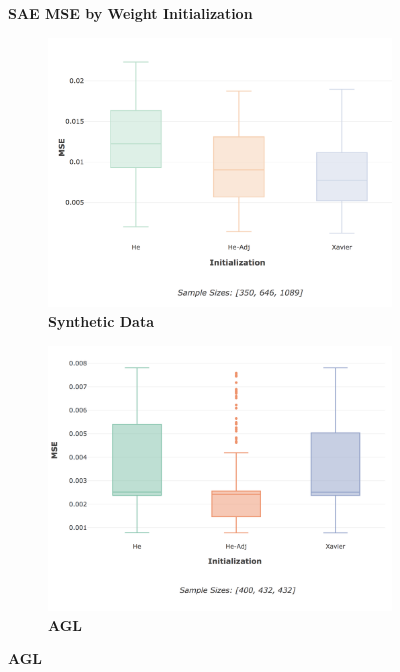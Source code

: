 \documentclass[a4paper,11pt,oneside]{article}
\theoremstyle{plain}
\theoremstyle{definition}
\begin{document}
\begin{figure}[H]
	\centering
	\textbf{SAE MSE by Weight Initialization}
	\begin{subfigure}{.5\textwidth}
		\centering 
		\includegraphics[scale=0.28]{images/results/newinit/synthetic_mse_init.png}
		\caption{\textbf{Synthetic Data} 
			\newline }
		\label{figure-synthetic_mse_init}
	\end{subfigure}%
	\begin{subfigure}{.5\textwidth}
		\centering 
		\includegraphics[scale=0.28]{images/results/newinit/agl_mse_init.png}
		\caption{\textbf{AGL} 
			\newline }

\end{subfigure}
\end{figure}
\end{document}
